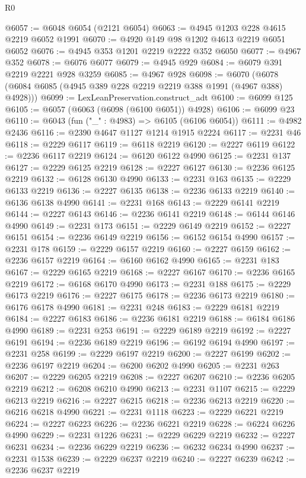 \begin{lexlean}{R0}
\begin{coremodule}
@6057 := @6048 @6054 (@2121 @6054)
@6063 := @4945 @1203 @228 @4615 @2219 @6052 @1991
@6070 := @4920 @149 @98 @1202 @4613 @2219 @6051 @6052
@6076 := @4945 @353 @1201 @2219 @2222 @352 @6050
@6077 := @4967 @352
@6078 := @6076 @6077
@6079 := @4945 @929
@6084 := @6079 @391 @2219 @2221 @928 @3259
@6085 := @4967 @928
@6098 := @6070 (@6078 (@6084 @6085 (@4945 @389 @228 @2219 @2219 @388 @1991 (@4967 @388) @4928)))
@6099 := LexLeanPreservation.construct_adt
@6100 := @6099 @125
@6105 := @6057 (@6063 (@6098 (@6100 @6051)) @4928)
@6106 := @6099 @23
@6110 := @6043 (fun ("_" : @4983) => @6105 (@6106 @6054))
@6111 := @4982 @2436
@6116 := @2390 @4647 @1127 @1214 @1915 @2224
@6117 := @2231 @46
@6118 := @2229 @6117
@6119 := @6118 @2219
@6120 := @2227 @6119
@6122 := @2236 @6117 @2219
@6124 := @6120 @6122 @4990
@6125 := @2231 @137
@6127 := @2229 @6125 @2219
@6128 := @2227 @6127
@6130 := @2236 @6125 @2219
@6132 := @6128 @6130 @4990
@6133 := @2231 @163
@6135 := @2229 @6133 @2219
@6136 := @2227 @6135
@6138 := @2236 @6133 @2219
@6140 := @6136 @6138 @4990
@6141 := @2231 @168
@6143 := @2229 @6141 @2219
@6144 := @2227 @6143
@6146 := @2236 @6141 @2219
@6148 := @6144 @6146 @4990
@6149 := @2231 @173
@6151 := @2229 @6149 @2219
@6152 := @2227 @6151
@6154 := @2236 @6149 @2219
@6156 := @6152 @6154 @4990
@6157 := @2231 @178
@6159 := @2229 @6157 @2219
@6160 := @2227 @6159
@6162 := @2236 @6157 @2219
@6164 := @6160 @6162 @4990
@6165 := @2231 @183
@6167 := @2229 @6165 @2219
@6168 := @2227 @6167
@6170 := @2236 @6165 @2219
@6172 := @6168 @6170 @4990
@6173 := @2231 @188
@6175 := @2229 @6173 @2219
@6176 := @2227 @6175
@6178 := @2236 @6173 @2219
@6180 := @6176 @6178 @4990
@6181 := @2231 @248
@6183 := @2229 @6181 @2219
@6184 := @2227 @6183
@6186 := @2236 @6181 @2219
@6188 := @6184 @6186 @4990
@6189 := @2231 @253
@6191 := @2229 @6189 @2219
@6192 := @2227 @6191
@6194 := @2236 @6189 @2219
@6196 := @6192 @6194 @4990
@6197 := @2231 @258
@6199 := @2229 @6197 @2219
@6200 := @2227 @6199
@6202 := @2236 @6197 @2219
@6204 := @6200 @6202 @4990
@6205 := @2231 @263
@6207 := @2229 @6205 @2219
@6208 := @2227 @6207
@6210 := @2236 @6205 @2219
@6212 := @6208 @6210 @4990
@6213 := @2231 @1107
@6215 := @2229 @6213 @2219
@6216 := @2227 @6215
@6218 := @2236 @6213 @2219
@6220 := @6216 @6218 @4990
@6221 := @2231 @1118
@6223 := @2229 @6221 @2219
@6224 := @2227 @6223
@6226 := @2236 @6221 @2219
@6228 := @6224 @6226 @4990
@6229 := @2231 @1226
@6231 := @2229 @6229 @2219
@6232 := @2227 @6231
@6234 := @2236 @6229 @2219
@6236 := @6232 @6234 @4990
@6237 := @2231 @1538
@6239 := @2229 @6237 @2219
@6240 := @2227 @6239
@6242 := @2236 @6237 @2219

\end{coremodule}
\end{lexlean}
